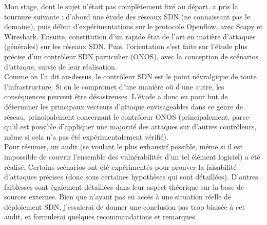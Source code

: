 Mon stage, dont le sujet n'était pas complètement fixé au départ, a pris la tournure suivante : d'abord une étude des réseaux SDN (ne connaissant pas le domaine), puis début d'expérimentations sur le protocole Openflow, avec Scapy et Wireshark. Ensuite, constitution d'un rapide état de l'art en matière d'attaques (générales) sur les réseaux SDN. Puis, l'orientation s'est faite sur l'étude plus précise d'un contrôleur SDN particulier (ONOS), avec la conception de scénarios d'attaque, suivie de leur réalisation.\\
Comme on l'a dit au-dessus, le contrôleur SDN est le point névralgique de toute l'infrastructure. Si on le compromet d'une manière où d'une autre, les conséquences peuvent être désastreuses. L'étude a donc eu pour but de déterminer les principaux vecteurs d'attaque envisageables dans ce genre de réseau, principalement concernant le contrôleur ONOS (principalement, parce qu'il  est possible d'appliquer une majorité des attaques sur d'autres contrôleurs, même si cela n'a pas été expérimentalement vérifié).\\
Pour résumer, un audit (se voulant le plus exhaustif possible, même si il est impossible de couvrir l'ensemble des vulnérabilités d'un tel élément logiciel) a été réalisé. Certains scénarios ont été expérimentés pour prouver la faisabilité d'attaques précises (donc sous certaines hypothèses qui sont détaillées). D'autres faiblesses sont également détaillées dans leur aspect théorique sur la base de sources externes. Bien que n'ayant pas eu accès à une situation réelle de déploiement SDN, j'essaierai de donner une conclusion pas trop biaisée à cet audit, et formulerai quelques recommandations et remarques.